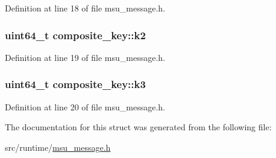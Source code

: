Definition at line 18 of file msu\-\_\-message.\-h.

\hypertarget{structcomposite__key_acc0a164822bca688f71dfa2d2ef2f536}{
\subsubsection[{k2}]{\setlength{\rightskip}{0pt plus 5cm}uint64\-\_\-t composite\-\_\-key\-::k2}}\label{structcomposite__key_acc0a164822bca688f71dfa2d2ef2f536}


Definition at line 19 of file msu\-\_\-message.\-h.

\hypertarget{structcomposite__key_a6a97650be5bd7102fca8a17b82c88bb5}{
\subsubsection[{k3}]{\setlength{\rightskip}{0pt plus 5cm}uint64\-\_\-t composite\-\_\-key\-::k3}}\label{structcomposite__key_a6a97650be5bd7102fca8a17b82c88bb5}


Definition at line 20 of file msu\-\_\-message.\-h.



The documentation for this struct was generated from the following file\-:\begin{DoxyCompactItemize}
\item 
src/runtime/\hyperlink{msu__message_8h}{msu\-\_\-message.\-h}\end{DoxyCompactItemize}
